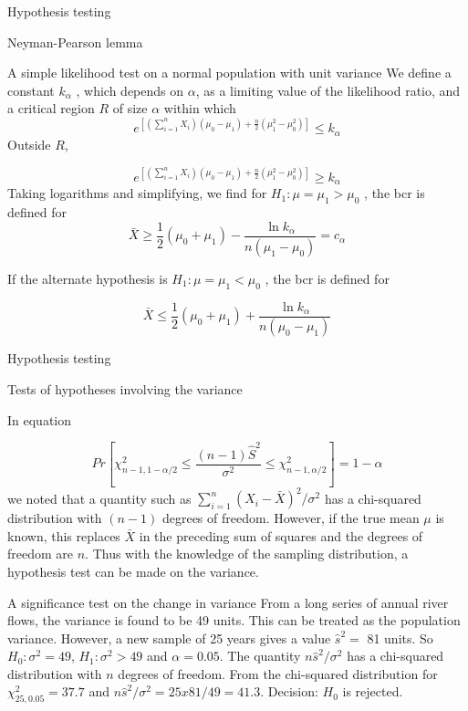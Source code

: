\documentclass[8pt]{beamer}
\renewcommand{\emph}[1]{\textcolor{myorange}{#1}}
\begin{document}
\begin{frame}{Hypothesis testing}
    \begin{block}{Neyman-Pearson lemma}
    \end{block}
    \begin{exampleblock}{A simple likelihood test on a normal population with unit variance}
        We define a constant $k_{\alpha}$ , which depends on $\alpha$, as a limiting value of the likelihood ratio, and a critical region $R$ of size $\alpha$ within which
        \[
            e^{\left[ \left(\sum_{i=1}^n X_i \right) (\mu_0 - \mu_1) + \frac{n}{2} \left( \mu_1^2 - \mu_0^2 \right) \right]} \leq k_{\alpha}
        \]
        Outside $R$,

        \[
            e^{\left[ \left(\sum_{i=1}^n X_i \right) (\mu_0 - \mu_1) + \frac{n}{2} \left( \mu_1^2 - \mu_0^2 \right) \right]} \geq k_{\alpha}
        \]
        Taking logarithms and simplifying, we find for $H_1 : \mu = \mu_1 > \mu_0$ , the \emph{bcr} is defined for
        \[
            \bar{X} \geq \frac{1}{2} (\mu_0 + \mu_1) - \frac{\ln k_{\alpha}}{n(\mu_1 - \mu_0)} = c_{\alpha}
        \]


        If the alternate hypothesis is $H_1 : \mu = \mu_1 < \mu_0$ , the \emph{bcr} is defined for

        \[
            \bar{X} \leq \frac{1}{2} (\mu_0 + \mu_1) + \frac{\ln k_{\alpha}}{n(\mu_0 - \mu_1)} 
        \]
    \end{exampleblock}
\end{frame}

\begin{frame}{Hypothesis testing}
    \begin{block}{Tests of hypotheses involving the variance}
    \end{block}
    In equation 

\[
    Pr \left[ \chi^2_{n-1, 1- \alpha/2} \leq \frac{(n-1)\hat{S}^2}{\sigma^2} \leq  \chi^2_{n-1, \alpha/2} \right] = 1-\alpha
\]
    we noted that a quantity such as $\sum_{i=1}^n (X_i - \bar{X} )^2 /\sigma^2$ has a \emph{chi-squared distribution} with $(n - 1)$ degrees of freedom. However, if the true mean $\mu$ is known, this replaces $\bar{X}$ in the preceding sum of squares and the degrees of freedom are $n$. Thus with the knowledge of the sampling distribution, a hypothesis test can be made on the variance.

    \begin{exampleblock}{A significance test on the change in variance}
        From a long series of annual river flows, the variance is found to be 49 units. This can be treated as the population variance. However, a new sample of 25 years gives a value $\hat{s}^2 =$ 81 units. So $H_0 : \sigma^2 = 49$, $H_1 : \sigma^2 > 49$ and $\alpha = 0.05$. 
        The quantity $n \hat{s}^2/\sigma^2$ has a \emph{chi-squared distribution} with $n$ degrees of freedom. From the \emph{chi-squared distribution} for $\chi_{25,0.05}^2 = 37.7$ and $n \hat{s}^2 / \sigma^2 = 25 x 81/49 = 41.3$. \emph{Decision: $H_0$ is rejected}.  
    \end{exampleblock}
\end{frame}
\end{document}
